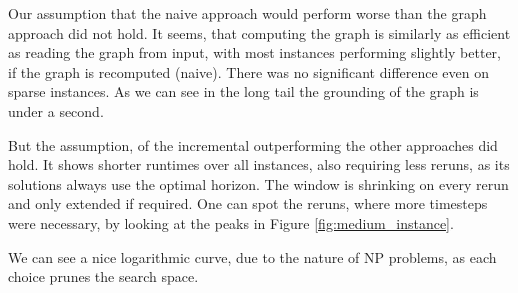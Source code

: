 Our assumption that the naive approach would perform worse than the graph approach did not hold. It seems, that computing the graph is similarly as efficient as reading the graph from input, with most instances performing slightly better, if the graph is recomputed (naive). There was no significant difference even on sparse instances. As we can see in the long tail the grounding of the graph is under a second.

But the assumption, of the incremental outperforming the other approaches did hold. It shows shorter runtimes over all instances, also requiring less reruns, as its solutions always use the optimal horizon. The window is shrinking on every rerun and only extended if required. One can spot the reruns, where more timesteps were necessary, by looking at the peaks in Figure \ref{fig:medium_instance}.

We can see a nice logarithmic curve, due to the nature of NP problems, as each choice prunes the search space.